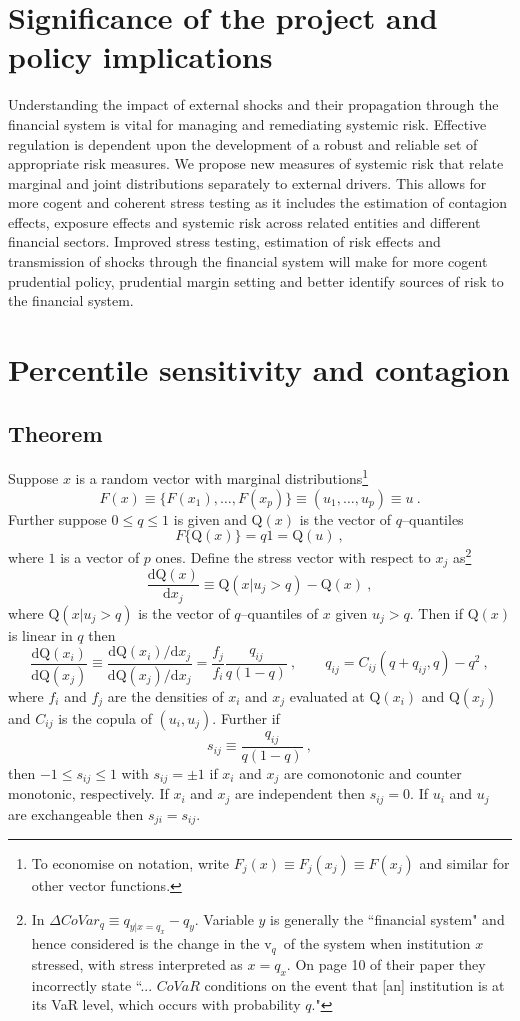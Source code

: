 \documentclass[authoryear]{elsarticle}
\newcommand{\be}{\begin{equation}}
\newcommand{\ee}{\end{equation}}
\newcommand{\de}{\mathrm{d}}
\renewcommand{\v}{\ensuremath{\mathrm{v}_q}}
\newcommand{\cq}{\ , \qquad}
\begin{document}
\section{Significance of the project and  policy implications}

Understanding the impact of external shocks and their propagation through   the financial system is vital for managing and remediating systemic risk. Effective regulation is dependent upon the development of a robust and reliable set of appropriate risk measures.  We propose new measures of systemic risk that relate marginal and joint distributions separately to external drivers. This allows for more cogent and coherent stress testing as it includes the estimation of contagion effects, exposure effects and systemic risk across related entities and different financial sectors. Improved stress testing, estimation of risk effects and transmission of shocks through the financial system will make for more cogent prudential policy, prudential margin setting and better identify sources of risk to the financial system.

\newcommand{\q}{\mathrm{Q}}
\section{Percentile sensitivity and contagion}\label{perc}

\subsection{Theorem}  Suppose $x$ is a random vector with marginal distributions\footnote{To economise on notation, write $F_j(x)\equiv F_j(x_j)\equiv F(x_j)$ and similar for other vector functions.} 
$$
F(x)\equiv \{F(x_1),\ldots ,F(x_p)\} \equiv (u_1,\ldots,u_p)\equiv u\ .
$$ 
Further suppose $0\le q\le 1$ is given and  $\q(x)$ is the vector of $q$--quantiles
$$
F\{\q(x)\}=q1=\q(u)\ ,
$$
where $1$ is a vector of $p$ ones. 
Define the stress vector with respect to $x_j$ as\footnote{In \cite{adrian2011covar}  $\Delta CoVar_q\equiv q_{y|x=q_x}-q_y$.  Variable $y$  is generally the ``financial system" and hence considered is the change in the \v\ of the system when institution $x$ stressed, with stress  interpreted as $x=q_x$.  On page 10 of their paper they incorrectly state ``... $CoVaR$ conditions on the event that [an] institution is at its VaR level, which occurs with probability $q$."} 
\be\label{stress}
\frac{\de\q(x)}{\de x_j} \equiv \q(x|u_j>q) - \q(x)\ ,
\ee
where $\q(x|u_j>q)$ is the vector of $q$--quantiles of $x$ given $u_j>q$.    Then if $\q(x)$  is linear in $q$ 
 then
\be\label{implicit}
\frac{\de\q(x_i)}{\de\q(x_j)} \equiv \frac{\de\q(x_i)/\de x_j}{\de\q(x_j)/\de x_j} =  
\frac{f_j}{f_i} 
 \frac{q_{ij}}{q(1-q)}\cq q_{ij}=C_{ij}(q+q_{ij},q) - q^2\ ,
\ee
where $f_i$ and $f_j$ are the densities of $x_i$ and $x_j$ evaluated at $\q(x_i)$ and $\q(x_j)$ and  $C_{ij}$ is the copula of $(u_i,u_j)$.   
Further if 
$$
s_{ij}\equiv \frac{q_{ij}}{q(1-q)}\ ,
$$ then  $-1\le s_{ij}\le 1$ with $s_{ij}=\pm 1$ if $x_i$ and $x_j$ are comonotonic and counter monotonic, respectively.  If $x_i$ and $x_j$ are independent then  $s_{ij}=0$. If $u_i$ and $u_j$ are exchangeable  then  $s_{ji}=s_{ij}$.
\end{document}
